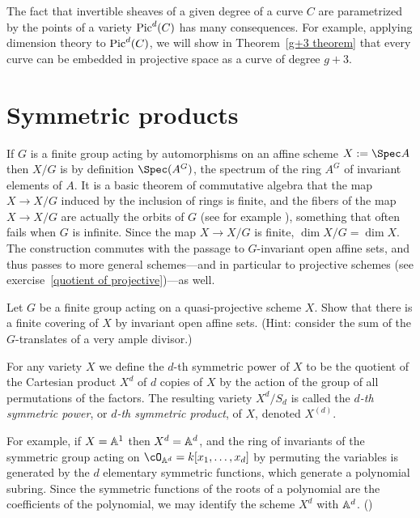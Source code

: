 The fact that invertible sheaves of a given degree of a curve $C$ are parametrized by the points of a variety $\pic^d(C)$ has many consequences.  For example, applying dimension theory to $\pic^d(C)$, we will show in Theorem~\ref{g+3 theorem} that every curve can be embedded in projective space as a curve of degree $g+3$.

\section{Symmetric products}\label{symmetric section}

If $G$ is a finite group acting by automorphisms on an affine scheme $X:=\Spec A$ then $X/G$ is by definition $\Spec(A^G)$, the spectrum of the ring $A^G$ of invariant elements of $A$. It is a basic theorem of commutative algebra that the map $X\to X/G$ induced by the inclusion of rings is finite, and the fibers of the map $X\to X/G$ are actually the orbits of $G$ (see for example \cite[Theorem ***]{E}), something that often fails when $G$ is infinite. Since the map $X\to X/G$ is finite, $\dim X/G = \dim X$. The construction commutes with the passage to $G$-invariant open affine sets, and thus passes to more general schemes---and in particular to projective schemes (see exercise~\ref{quotient of projective})---as well.

\begin{exercise}
 Let $G$ be a finite group acting on a quasi-projective scheme $X$. Show that there is a finite covering of $X$ by invariant open affine sets. (Hint: consider the sum of the $G$-translates of a very ample divisor.)
\end{exercise}

For any variety $X$  we define the $d$-th symmetric power of $X$ to be the quotient of the Cartesian product $X^d$ of $d$ copies of $X$ by the action of the group of all permutations of the factors. The resulting variety $X^d/S_d$ is called the \emph{$d$-th symmetric power}, or \emph{$d$-th symmetric product}, of $X$, denoted  $X^{(d)}$. 

For example, if $X=\AA^{1}$ then $X^{d} = \AA^{d}$, and the ring of invariants of the symmetric group acting on
$\cO_{\AA^{d}} = k[x_{1}, \dots, x_{d}]$ by permuting the variables is generated by the $d$ elementary symmetric functions, which generate a polynomial subring. Since the symmetric functions of the roots of a polynomial are the coefficients of
the polynomial, we may identify the scheme $X^{d}$ with $\AA^{d}$. (\cite[Exercises 1.6, 13.2-13.4]{E})

